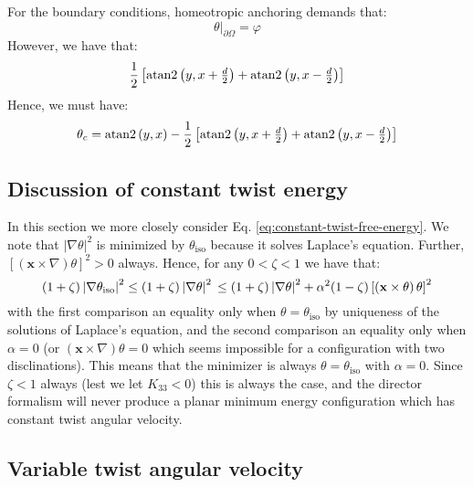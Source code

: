 \documentclass[reqno]{article}
\begin{document}
For the boundary conditions, homeotropic anchoring demands that:
\begin{equation}
    \left.\theta \right|_{\partial \Omega}
    =
    \varphi
\end{equation}
However, we have that:
\begin{equation}
    \frac12 \left[
        \operatorname{atan2} \left(y, x + \tfrac{d}{2}\right)
        + \operatorname{atan2} \left(y, x - \tfrac{d}{2}\right)
    \right]
\end{equation}
Hence, we must have:
\begin{equation}
    \theta_c
    =
    \operatorname{atan2} \left(y, x \right)
    -
    \frac12 \left[
        \operatorname{atan2} \left(y, x + \tfrac{d}{2}\right)
        + \operatorname{atan2} \left(y, x - \tfrac{d}{2}\right)
    \right]
\end{equation}

\subsection{Discussion of constant twist energy}

In this section we more closely consider Eq. \eqref{eq:constant-twist-free-energy}.
We note that $\left| \nabla \theta \right|^2$ is minimized by $\theta_\text{iso}$ because it solves Laplace's equation.
Further, $\left[ (\mathbf x \times \nabla ) \theta \right]^2 >0$ always. 
Hence, for any $0 < \zeta < 1$ we have that:
\begin{equation}
    (1 + \zeta) \left| \nabla \theta_\text{iso} \right|^2
    \leq
    (1 + \zeta) \left| \nabla \theta \right|^2 \\
    \leq
    (1 + \zeta) \left| \nabla \theta \right|^2 + \alpha^2 (1 - \zeta) \left[ \left( \mathbf x \times \theta \right) \theta \right]^2
\end{equation}
with the first comparison an equality only when $\theta = \theta_\text{iso}$ by uniqueness of the solutions of Laplace's equation, and the second comparison an equality only when $\alpha = 0$ (or $(\mathbf x \times \nabla) \theta = 0$ which seems impossible for a configuration with two disclinations). 
This means that the minimizer is always $\theta = \theta_\text{iso}$ with $\alpha = 0$.
Since $\zeta < 1$ always (lest we let $K_33 < 0$) this is always the case, and the director formalism will never produce a planar minimum energy configuration which has constant twist angular velocity.

\subsection{Variable twist angular velocity}
\end{document}

